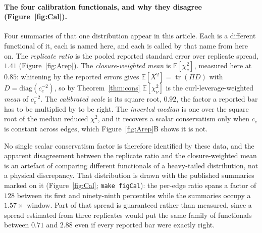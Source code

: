 \paragraph{The four calibration functionals, and why they disagree (Figure~\ref{fig:Cal}).}
Four summaries of that one distribution appear in this article. Each is a different functional of
it, each is named here, and each is called by that name from here on. The \emph{replicate ratio} is
the pooled reported standard error over replicate spread, $1.41$ (Figure~\ref{fig:Arep}). The
\emph{closure-weighted mean} is $\mathbb{E}[\chi^2_\nu]$, measured here at $0.85$: whitening by the
reported errors gives $\mathbb{E}[X^2]=\operatorname{tr}(\Pi D)$ with $D=\mathrm{diag}(c_e^{-2})$,
so by Theorem~\ref{thm:cons} $\mathbb{E}[\chi^2_\nu]$ is the curl-leverage-weighted \emph{mean} of
$c_e^{-2}$. The \emph{calibrated scale} is its square root, $0.92$, the factor a reported bar has
to be multiplied by to be right. The \emph{inverted median} is one over the square root of the
median reduced $\chi^2$, and it recovers a scalar conservatism only when $c_e$ is constant across
edges, which Figure~\ref{fig:Arep}B shows it is not.

No single scalar conservatism factor is therefore identified by these data, and the apparent
disagreement between the replicate ratio and the closure-weighted mean is an artefact of comparing
different functionals of a heavy-tailed distribution, not a physical discrepancy. That distribution
is drawn with the published summaries marked on it (Figure~\ref{fig:Cal}; \texttt{make figCal}):
the per-edge ratio spans a factor of $128$ between its first and ninety-ninth percentiles while the
summaries occupy a $1.57\times$ window. Part of that spread is guaranteed rather than measured,
since a spread estimated from three replicates would put the same family of functionals between
$0.71$ and $2.88$ even if every reported bar were exactly right.

